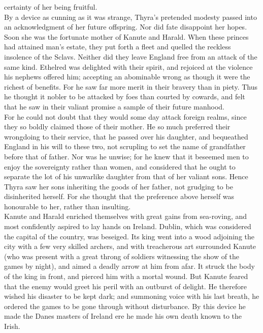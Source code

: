 \documentclass[10pt,a4paper]{report}
\begin{document}
certainty of her being fruitful.\\

By a device as cunning as it was strange, Thyra's pretended modesty passed into an acknowledgment of her future offspring. Nor did fate disappoint her hopes. Soon she was the fortunate mother of Kanute and Harald. When these princes had attained man's estate, they put forth a fleet and quelled the reckless insolence of the Sclavs. Neither did they leave England free from an attack of the same kind. Ethelred was delighted with their spirit, and rejoiced at the violence his nephews offered him; accepting an abominable wrong as though it were the richest of benefits. For he saw far more merit in their bravery than in piety. Thus he thought it nobler to be attacked by foes than courted by cowards, and felt that he saw in their valiant promise a sample of their future manhood.\\

For he could not doubt that they would some day attack foreign realms, since they so boldly claimed those of their mother. He so much preferred their wrongdoing to their service, that he passed over his daughter, and bequeathed England in his will to these two, not scrupling to set the name of grandfather before that of father. Nor was he unwise; for he knew that it beseemed men to enjoy the sovereignty rather than women, and considered that he ought to separate the lot of his unwarlike daughter from that of her valiant sons. Hence Thyra saw her sons inheriting the goods of her father, not grudging to be disinherited herself. For she thought that the preference above herself was honourable to her, rather than insulting.\\

Kanute and Harald enriched themselves with great gains from sea-roving, and most confidently aspired to lay hands on Ireland. Dublin, which was considered the capital of the country, was beseiged. Its king went into a wood adjoining the city with a few very skilled archers, and with treacherous art surrounded Kanute (who was present with a great throng of soldiers witnessing the show of the games by night), and aimed a deadly arrow at him from afar. It struck the body of the king in front, and pierced him with a mortal wound. But Kanute feared that the enemy would greet his peril with an outburst of delight. He therefore wished his disaster to be kept dark; and summoning voice with his last breath, he ordered the games to be gone through without disturbance. By this device he made the Danes masters of Ireland ere he made his own death known to the Irish.\\
\end{document}

